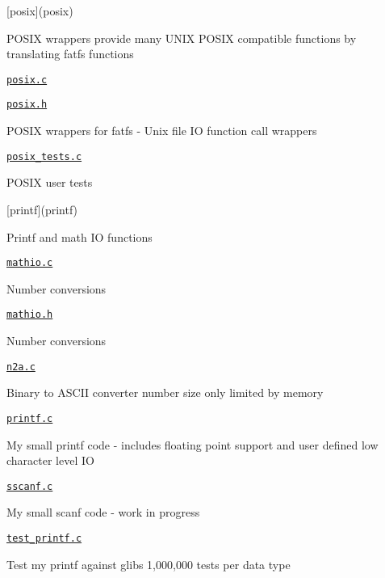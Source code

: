 \mbox{[}posix\mbox{]}(posix)
\begin{DoxyItemize}
\item P\+O\+S\+IX wrappers provide many U\+N\+IX P\+O\+S\+IX compatible functions by translating fatfs functions
\item \href{posix/posix.c}{\tt posix.\+c}
\item \href{posix/posix.h}{\tt posix.\+h}
\begin{DoxyItemize}
\item P\+O\+S\+IX wrappers for fatfs -\/ Unix file IO function call wrappers
\end{DoxyItemize}
\item \href{posix/posix_tests.c}{\tt posix\+\_\+tests.\+c}
\begin{DoxyItemize}
\item P\+O\+S\+IX user tests
\end{DoxyItemize}
\end{DoxyItemize}

\mbox{[}printf\mbox{]}(printf)
\begin{DoxyItemize}
\item Printf and math IO functions
\item \href{printf/mathio.c}{\tt mathio.\+c}
\begin{DoxyItemize}
\item Number conversions
\end{DoxyItemize}
\item \href{printf/mathio.h}{\tt mathio.\+h}
\begin{DoxyItemize}
\item Number conversions
\end{DoxyItemize}
\item \href{printf/n2a.c}{\tt n2a.\+c}
\begin{DoxyItemize}
\item Binary to A\+S\+C\+II converter number size only limited by memory
\end{DoxyItemize}
\item \href{printf/printf.c}{\tt printf.\+c}
\begin{DoxyItemize}
\item My small printf code -\/ includes floating point support and user defined low character level IO
\end{DoxyItemize}
\item \href{printf/sscanf.c}{\tt sscanf.\+c}
\begin{DoxyItemize}
\item My small scanf code -\/ work in progress
\end{DoxyItemize}
\item \href{printf/test_printf.c}{\tt test\+\_\+printf.\+c}
\begin{DoxyItemize}
\item Test my printf against glibs 1,000,000 tests per data type
\end{DoxyItemize}
\end{DoxyItemize}

